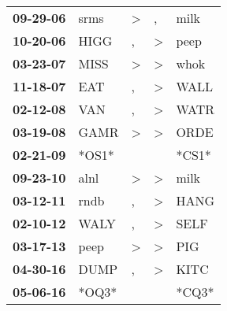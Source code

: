 \begin{supertabular}{p{0.07\textwidth}p{0.06\textwidth}p{0.02\textwidth}p{0.02\textwidth}p{0.06\textwidth}}
 \textbf{09-29-06\textsuperscript{}} &           srms\textsuperscript{} &     \textgreater &                , &  milk\textsuperscript{} \\
 \textbf{10-20-06\textsuperscript{}} &           HIGG\textsuperscript{} &                , &     \textgreater &  peep\textsuperscript{} \\
 \textbf{03-23-07\textsuperscript{}} &           MISS\textsuperscript{} &     \textgreater &     \textgreater &  whok\textsuperscript{} \\
 \textbf{11-18-07\textsuperscript{}} &            EAT\textsuperscript{} &                , &     \textgreater &  WALL\textsuperscript{} \\
 \textbf{02-12-08\textsuperscript{}} &            VAN\textsuperscript{} &                , &     \textgreater &  WATR\textsuperscript{} \\
 \textbf{03-19-08\textsuperscript{}} &           GAMR\textsuperscript{} &     \textgreater &     \textgreater &  ORDE\textsuperscript{} \\
 \textbf{02-21-09\textsuperscript{}} &                            *OS1* &                  &                  &                   *CS1* \\
 \textbf{09-23-10\textsuperscript{}} &           alnl\textsuperscript{} &     \textgreater &     \textgreater &  milk\textsuperscript{} \\
 \textbf{03-12-11\textsuperscript{}} &           rndb\textsuperscript{} &                , &     \textgreater &  HANG\textsuperscript{} \\
 \textbf{02-10-12\textsuperscript{}} &           WALY\textsuperscript{} &                , &     \textgreater &  SELF\textsuperscript{} \\
 \textbf{03-17-13\textsuperscript{}} &           peep\textsuperscript{} &     \textgreater &     \textgreater &   PIG\textsuperscript{} \\
 \textbf{04-30-16\textsuperscript{}} &           DUMP\textsuperscript{} &                , &     \textgreater &  KITC\textsuperscript{} \\
 \textbf{05-06-16\textsuperscript{}} &                            *OQ3* &                  &                  &                   *CQ3* \\
\end{supertabular}

